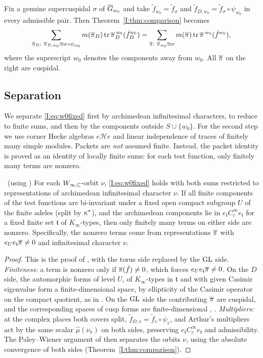 Fix a genuine supercuspidal $\sigma$ of $\overline{G}_{w_0}$ and take $\tilde f_{w_0}=\tilde f_\sigma$ and $\tilde f_{D,w_0}=\tilde f_\sigma\circ\psi_{w_0}$ in every admissible pair. Then Theorem~\ref{I:thm:comparison} becomes
\begin{equation}\label{I:eq:w0fixed}
\sum_{\pib_D:\ \pib_{D,w_0}\cong\sigma\circ\psi_{w_0}}m(\pib_D)\tr\pib_D^{\,w_0}(\tilde f_D^{w_0})=\sum_{\pib:\ \pib_{w_0}\cong\sigma}m(\pib)\tr\pib^{\,w_0}(\tilde f^{w_0}),
\end{equation}
where the superscript $w_0$ denotes the components away from $w_0$. All $\overline{\pi}$ on the right are cuspidal.

\subsection{Separation}\label{I:subsec:sep}
We separate \eqref{I:eq:w0fixed} first by archimedean infinitesimal characters, to reduce to finite sums, and then by the components outside $S\cup\{w_0\}$. For the second step we use corner Hecke algebras $e\mathcal He$ and linear independence of traces of finitely many simple modules. Packets are \emph{not} assumed finite. Instead, the packet identity is proved as an identity of locally finite sums: for each test function, only finitely many terms are nonzero.

\begin{lemma}\label{I:lem:nusep}\ (using \Ev)
For each $W_{\infty,\mathbb{C}}$-orbit $\nu$, \eqref{I:eq:w0fixed} holds with both sums restricted to representations of archimedean infinitesimal character $\nu$. If all finite components of the test functions are bi-invariant under a fixed open compact subgroup $U$ of the finite adeles (split by $\kappa^{*}$), and the archimedean components lie in $e_{\mathfrak t}C_c^\infty e_{\mathfrak t}$ for a fixed finite set $\mathfrak t$ of $K_\infty$-types, then only finitely many terms on either side are nonzero. Specifically, the nonzero terms come from representations $\overline{\pi}$ with $e_Ue_{\mathfrak t}\overline{\pi}\neq0$ and infinitesimal character $\nu$.
\end{lemma}
\begin{proof}
This is the proof of \cite[Lemma~6.12]{JC26a}, with the torus side replaced by the $\mathrm{GL}$ side. \emph{Finiteness:} a term is nonzero only if $\overline{\pi}(\tilde f)\neq0$, which forces $e_Ue_{\mathfrak t}\overline{\pi}\neq0$. On the $D$ side, the automorphic forms of level $U$, of $K_\infty$-types in $\mathfrak t$ and with given Casimir eigenvalue form a finite-dimensional space, by ellipticity of the Casimir operator on the compact quotient, as in \cite[Lemma~6.12]{JC26a}. On the $\mathrm{GL}$ side the contributing $\overline{\pi}$ are cuspidal, and the corresponding spaces of cusp forms are finite-dimensional \cite{HC68}, \cite[I.2]{MW95} \Ev. \emph{Multipliers:} at the complex places both covers split, $\tilde f_{D,v}=\tilde f_v\circ\psi_v$, and Arthur's multipliers \cite[Lemma~6.3]{JC26a} act by the same scalar $\hat\mu(\nu_\pi)$ on both sides, preserving $e_{\mathfrak t}C_c^\infty e_{\mathfrak t}$ and admissibility. The Paley--Wiener argument of \cite[Lemma~6.12]{JC26a} then separates the orbits $\nu$, using the absolute convergence of both sides (Theorem~\ref{I:thm:comparison}).
\end{proof}

